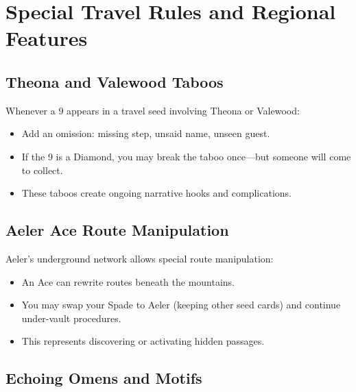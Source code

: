 \section{Special Travel Rules and Regional Features}\label{sec:special_rules}

\subsection{Theona and Valewood Taboos}\label{subsec:theona_taboos}

Whenever a 9 appears in a travel seed involving Theona or Valewood:
\begin{itemize}
    \item Add an omission: missing step, unsaid name, unseen guest.
    \item If the 9 is a Diamond, you may break the taboo once---but someone will come to collect.
    \item These taboos create ongoing narrative hooks and complications.
\end{itemize}

\subsection{Aeler Ace Route Manipulation}\label{subsec:aeler_aces}

Aeler's underground network allows special route manipulation:
\begin{itemize}
    \item An Ace can rewrite routes beneath the mountains.
    \item You may swap your Spade to Aeler (keeping other seed cards) and continue under-vault procedures.
    \item This represents discovering or activating hidden passages.
\end{itemize}

\subsection{Echoing Omens and Motifs}\label{subsec:echoing_omens}

